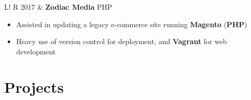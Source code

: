 \documentclass[10pt, a4paper]{article}
\newcommand\vsep{\color{lightgray} \vrule width 0.5pt}
\newcommand\sect[1]{\section*{\hspace{.05cm} \Large\sc #1}}
\newcommand\itemizespace{\vspace{-0.65\baselineskip}}
\newcommand\finishsectionspace{\vspace{-0.9\baselineskip}}
\newcommand\tspace{\hfill}
\begin{document}
\begin{tabular}{L!{\vsep}R}
                2017 & \textbf{Zodiac Media} \tspace PHP
                    \begin{itemize}[label=\raisebox{0.25ex}{\tiny$\bullet$}]
                        \setlength{\itemindent}{-0.125in}
                        \item Assisted in updating a legacy e-commerce site running \textbf{Magento} (\textbf{PHP})
                        \item Heavy use of version control for deployment, and \textbf{Vagrant} for web development
                        \finishsectionspace
                    \end{itemize}
            \end{tabular}
        \sect{Projects}
\end{document}
